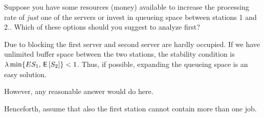 
\begin{exercise}[201706]
Suppose you have some resources (money) available to increase the processing rate of \emph{just} one of the servers or invest in queueing space between stations 1 and 2.. Which of these options should you suggest to analyze first? 
\begin{solution}
Due to blocking the first server and second server are hardly occupied. 
If  we have unlimited buffer space between the two stations, the stability condition is 
$\lambda\min\{E{S_1}, \,\mathsf{E}\left[S_2\right]\}<1$.   
Thus, if possible, expanding the queueing space is an easy solution.

However, any reasonable answer would do here.
\end{solution}
\end{exercise}


Henceforth, assume that also the first station cannot contain more than one job. 

